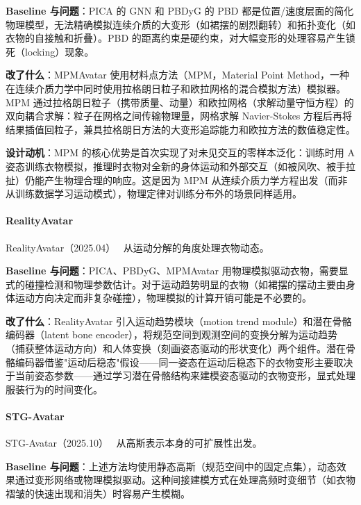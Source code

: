 \textbf{Baseline 与问题}：PICA 的 GNN 和 PBDyG 的 PBD 都是位置/速度层面的简化物理模型，无法精确模拟连续介质的大变形（如裙摆的剧烈翻转）和拓扑变化（如衣物的自接触和折叠）。PBD 的距离约束是硬约束，对大幅变形的处理容易产生锁死（locking）现象。

\textbf{改了什么}：MPMAvatar 使用材料点方法（MPM，Material Point Method，一种在连续介质力学中同时使用拉格朗日粒子和欧拉网格的混合模拟方法）模拟器。MPM 通过拉格朗日粒子（携带质量、动量）和欧拉网格（求解动量守恒方程）的双向耦合求解：粒子在网格之间传输物理量，网格求解 Navier-Stokes 方程后再将结果插值回粒子，兼具拉格朗日方法的大变形追踪能力和欧拉方法的数值稳定性。

\textbf{设计动机}：MPM 的核心优势是首次实现了对未见交互的零样本泛化：训练时用 A 姿态训练衣物模拟，推理时衣物对全新的身体运动和外部交互（如被风吹、被手拉扯）仍能产生物理合理的响应。这是因为 MPM 从连续介质力学方程出发（而非从训练数据学习运动模式），物理定律对训练分布外的场景同样适用。

\paragraph{RealityAvatar}

RealityAvatar（2025.04）~\cite{2504_01559} 从运动分解的角度处理衣物动态。

\textbf{Baseline 与问题}：PICA、PBDyG、MPMAvatar 用物理模拟驱动衣物，需要显式的碰撞检测和物理参数估计。对于运动趋势明显的衣物（如裙摆的摆动主要由身体运动方向决定而非复杂碰撞），物理模拟的计算开销可能是不必要的。

\textbf{改了什么}：RealityAvatar 引入运动趋势模块（motion trend module）和潜在骨骼编码器（latent bone encoder），将规范空间到观测空间的变换分解为运动趋势（捕获整体运动方向）和人体变换（刻画姿态驱动的形状变化）两个组件。潜在骨骼编码器借鉴"运动后稳态"假设——同一姿态在运动后稳态下的衣物变形主要取决于当前姿态参数——通过学习潜在骨骼结构来建模姿态驱动的衣物变形，显式处理服装行为的时间变化。

\paragraph{STG-Avatar}

STG-Avatar（2025.10）~\cite{2510_22140} 从高斯表示本身的可扩展性出发。

\textbf{Baseline 与问题}：上述方法均使用静态高斯（规范空间中的固定点集），动态效果通过变形网络或物理模拟驱动。这种间接建模方式在处理高频时变细节（如衣物褶皱的快速出现和消失）时容易产生模糊。

